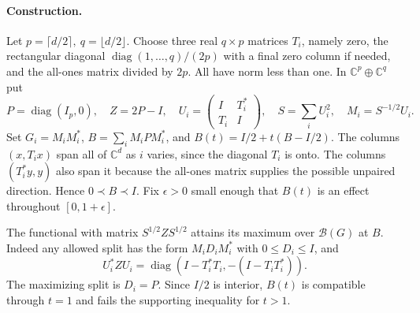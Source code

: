 \documentclass[10pt,a4paper]{article}
\newcommand{\C}{\mathbb C}
\begin{document}
\paragraph{Construction.}
Let \(p=\lceil d/2\rceil,\ q=\lfloor d/2\rfloor\). Choose three real
\(q\times p\) matrices \(T_i\), namely zero, the rectangular diagonal
\(\operatorname{diag}(1,\ldots,q)/(2p)\) with a final zero column if needed,
and the all-ones matrix divided by \(2p\). All have norm less than one.
In \(\C^p\oplus\C^q\) put
\[
 P=\operatorname{diag}(I_p,0),\quad Z=2P-I,\quad
 U_i=\begin{pmatrix}I&T_i^*\\T_i&I\end{pmatrix},\quad
 S=\sum_i U_i^2,\quad M_i=S^{-1/2}U_i.
\]
Set \(G_i=M_iM_i^*\), \(B=\sum_i M_i P M_i^*\), and
\(B(t)=I/2+t(B-I/2)\). The columns \((x,T_ix)\) span all of \(\C^d\)
as \(i\) varies, since the diagonal \(T_i\) is onto. The columns
\((T_i^*y,y)\) also span it because the all-ones matrix supplies the possible
unpaired direction. Hence \(0\prec B\prec I\). Fix \(\epsilon>0\) small
enough that \(B(t)\) is an effect throughout \([0,1+\epsilon]\).

The functional with matrix \(S^{1/2}ZS^{1/2}\) attains its maximum over
\(\mathcal B(G)\) at \(B\). Indeed any allowed split has the form \(M_i D_i M_i^*\)
with \(0\le D_i\le I\), and
\[
 U_i^* Z U_i=\operatorname{diag}(I-T_i^*T_i,-(I-T_iT_i^*)).
\]
The maximizing split is \(D_i=P\). Since \(I/2\) is interior, \(B(t)\)
is compatible through \(t=1\) and fails the supporting inequality for \(t>1\).
\end{document}

